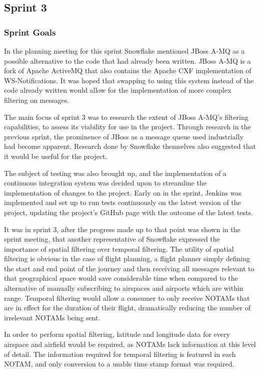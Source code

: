 \documentclass[a4paper, 12pt, twoside]{article}
\begin{document}
\subsection{Sprint 3}
\label{sec:impl_sprint_3}

\subsubsection{Sprint Goals}

In the planning meeting for this sprint Snowflake mentioned JBoss A-MQ as a possible alternative to the code that had already been written. JBoss A-MQ is a fork of Apache ActiveMQ that also contains the Apache CXF implementation of WS-Notifications. It was hoped that swapping to using this system instead of the code already written would allow for the implementation of more complex filtering on messages. 

The main focus of sprint 3 was to research the extent of JBoss A-MQ's filtering capabilities, to assess its viability for use in the project. Through research in the previous sprint, the prominence of JBoss as a message queue used industrially had become apparent. Research done by Snowflake themselves also suggested that it would be useful for the project.

The subject of testing was also brought up, and the implementation of a continuous integration system was decided upon to streamline the implementation of changes to the project. Early on in the sprint, Jenkins was implemented and set up to run tests continuously on the latest version of the project, updating the project's GitHub page with the outcome of the latest tests.

It was in sprint 3, after the progress made up to that point was shown in the sprint meeting, that another representative of Snowflake expressed the importance of spatial filtering over temporal filtering. The utility of spatial filtering is obvious in the case of flight planning, a flight planner simply defining the start and end point of the journey and then receiving all messages relevant to that geographical space would save considerable time when compared to the alternative of manually subscribing to airspaces and airports which are within range. Temporal filtering would allow a consumer to only receive NOTAMs that are in effect for the duration of their flight, dramatically reducing the number of irrelevant NOTAMs being sent.

In order to perform spatial filtering, latitude and longitude data for every airspace and airfield would be required, as NOTAMs lack information at this level of detail. The information required for temporal filtering is featured in each NOTAM, and only conversion to a usable time stamp format was required.
\end{document}
